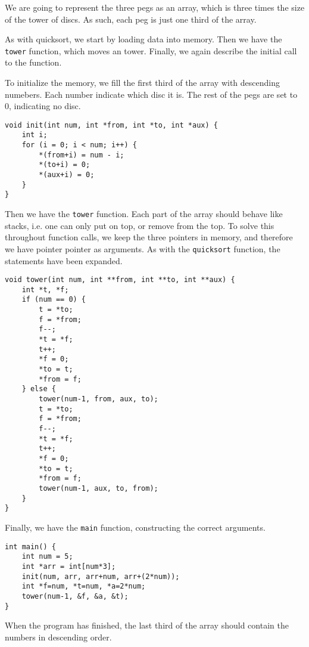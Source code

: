 \documentclass{beamer}
\begin{document}
\begin{frame}
    We are going to represent the three pegs as an array, which is three times
    the size of the tower of discs. As such, each peg is just one third of the
    array.

    \vspace{\baselineskip}
    As with quicksort, we start by loading data into memory. Then we have the
    \texttt{tower} function, which moves an tower. Finally, we again describe
    the initial call to the function.
\end{frame}
\begin{frame}[fragile]
    To initialize the memory, we fill the first third of the array with
    descending numebers. Each number indicate which disc it is. The rest of the
    pegs are set to 0, indicating no disc.
\begin{lstlisting}
void init(int num, int *from, int *to, int *aux) {
    int i;
    for (i = 0; i < num; i++) {
        *(from+i) = num - i;
        *(to+i) = 0;
        *(aux+i) = 0;
    }
}
\end{lstlisting}
\end{frame}

\begin{frame}
    Then we have the \texttt{tower} function. Each part of the array should
    behave like stacks, i.e. one can only put on top, or remove from the top.
    To solve this throughout function calls, we keep the three pointers in
    memory, and therefore we have pointer pointer as arguments. As with the
    \texttt{quicksort} function, the statements have been expanded.
\end{frame}
\begin{frame}[fragile]
\begin{lstlisting}
void tower(int num, int **from, int **to, int **aux) {
    int *t, *f;
    if (num == 0) {
        t = *to;
        f = *from;
        f--;
        *t = *f;
        t++;
        *f = 0;
        *to = t;
        *from = f;
    } else {
        tower(num-1, from, aux, to);
        t = *to;
        f = *from;
        f--;
        *t = *f;
        t++;
        *f = 0;
        *to = t;
        *from = f;
        tower(num-1, aux, to, from);
    }
}
\end{lstlisting}
\end{frame}

\begin{frame}[fragile]
    Finally, we have the \texttt{main} function, constructing the correct
    arguments.
\begin{lstlisting}
int main() {
    int num = 5;
    int *arr = int[num*3];
    init(num, arr, arr+num, arr+(2*num));
    int *f=num, *t=num, *a=2*num;
    tower(num-1, &f, &a, &t);
}
\end{lstlisting}
    When the program has finished, the last third of the array should contain
    the numbers in descending order.
\end{frame}
\end{document}
